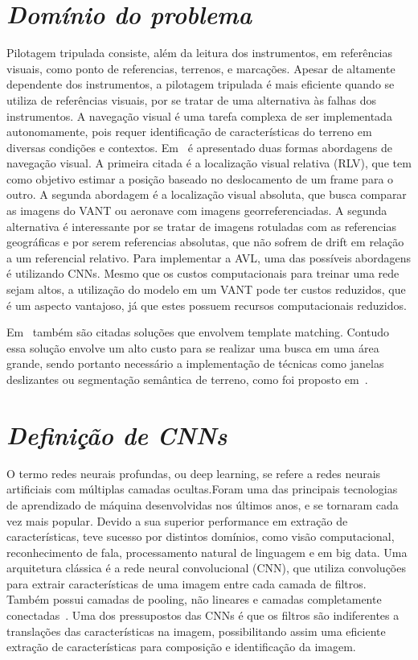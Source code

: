 

\section{\textit{Domínio do problema}}\label{sec:Cap2_MR}

Pilotagem tripulada consiste, além da leitura dos instrumentos, em referências visuais, como ponto de referencias, terrenos, e marcações. Apesar de altamente dependente dos instrumentos, a pilotagem tripulada é mais eficiente quando se utiliza de referências visuais, por se tratar de uma alternativa às falhas dos instrumentos. A navegação visual é uma tarefa complexa de ser implementada autonomamente, pois requer identificação de características do terreno em diversas condições e contextos. Em~\cite{COUTURIER2021103666} é apresentado duas formas abordagens de navegação visual. A primeira citada é a localização visual relativa (RLV), que tem como objetivo estimar a posição baseado no deslocamento de um frame para o outro. A segunda abordagem é a localização visual absoluta, que busca comparar as imagens do VANT ou aeronave com imagens georreferenciadas. A segunda alternativa é interessante por se tratar de imagens rotuladas com as referencias geográficas e por serem referencias absolutas, que não sofrem de drift em relação a um referencial relativo. Para implementar a AVL, uma das possíveis abordagens é utilizando CNNs. Mesmo que os custos computacionais para treinar uma rede sejam altos, a utilização do modelo em um VANT pode ter custos reduzidos, que é um aspecto vantajoso, já que estes possuem recursos computacionais reduzidos.

Em~\cite{COUTURIER2021103666} também são citadas soluções que envolvem template matching. Contudo essa solução envolve um alto custo para se realizar uma busca em uma área grande, sendo portanto necessário a implementação de técnicas como janelas deslizantes ou segmentação semântica de terreno, como foi proposto em~\cite{9552597}. 

\section{\textit{Definição de CNNs}}\label{sec:Cap2_MR}

O termo redes neurais profundas, ou deep learning, se refere a redes neurais artificiais com múltiplas camadas ocultas.Foram uma das principais tecnologias de aprendizado de máquina desenvolvidas nos últimos anos, e se tornaram cada vez mais popular. Devido a sua superior performance em extração de características, teve sucesso por distintos domínios, como visão computacional, reconhecimento de fala, processamento natural de linguagem e em big data. Uma arquitetura clássica é a rede neural convolucional (CNN), que utiliza convoluções para extrair características de uma imagem entre cada camada de filtros. Também possui camadas de pooling, não lineares e camadas completamente conectadas~\cite{8308186}. Uma dos pressupostos das CNNs é que os filtros são indiferentes a translações das características na imagem, possibilitando assim uma eficiente extração de características para composição e identificação da imagem.

